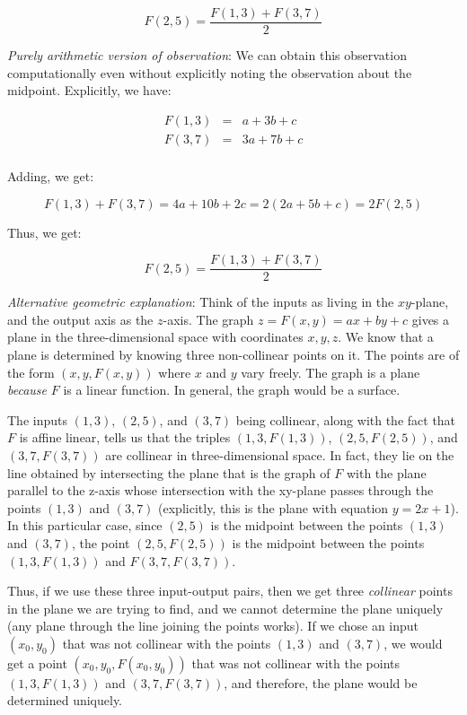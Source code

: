 \documentclass[10pt]{amsart}
\begin{document}
\begin{enumerate}
  $$F(2,5) = \frac{F(1,3) + F(3,7)}{2}$$

  {\em Purely arithmetic version of observation}: We can obtain this
  observation computationally even without explicitly noting the
  observation about the midpoint.  Explicitly, we have:

  \begin{eqnarray*}
    F(1,3) & = & a + 3b + c \\
    F(3,7) & = & 3a + 7b + c\\
  \end{eqnarray*}

  Adding, we get:

  $$F(1,3) + F(3,7) = 4a + 10b + 2c = 2(2a + 5b + c) = 2F(2,5)$$

  Thus, we get:

  $$F(2,5) = \frac{F(1,3) + F(3,7)}{2}$$

  {\em Alternative geometric explanation}: Think of the inputs as
  living in the $xy$-plane, and the output axis as the $z$-axis. The
  graph $z = F(x,y) = ax + by + c$ gives a plane in the
  three-dimensional space with coordinates $x,y,z$. We know that a
  plane is determined by knowing three non-collinear points on it. The
  points are of the form $(x,y,F(x,y))$ where $x$ and $y$ vary
  freely. The graph is a plane {\em because} $F$ is a linear
  function. In general, the graph would be a surface.

  The inputs $(1,3)$, $(2,5)$, and $(3,7)$ being collinear, along with
  the fact that $F$ is affine linear, tells us that the triples
  $(1,3,F(1,3))$, $(2,5,F(2,5))$, and $(3,7,F(3,7))$ are collinear in
  three-dimensional space. In fact, they lie on the line obtained by
  intersecting the plane that is the graph of $F$ with the plane
  parallel to the z-axis whose intersection with the xy-plane passes
  through the points $(1,3)$ and $(3,7)$ (explicitly, this is the
  plane with equation $y = 2x + 1$). In this particular case, since
  $(2,5)$ is the midpoint between the points $(1,3)$ and $(3,7)$, the
  point $(2,5,F(2,5))$ is the midpoint between the points
  $(1,3,F(1,3))$ and $F(3,7,F(3,7))$.

  Thus, if we use these three input-output pairs, then we get three
  {\em collinear} points in the plane we are trying to find, and we
  cannot determine the plane uniquely (any plane through the line
  joining the points works). If we chose an input $(x_0,y_0)$ that was
  not collinear with the points $(1,3)$ and $(3,7)$, we would get a
  point $(x_0,y_0,F(x_0,y_0))$ that was not collinear with the points
  $(1,3,F(1,3))$ and $(3,7,F(3,7))$, and therefore, the plane would be
  determined uniquely.


\end{enumerate}
\end{document}
